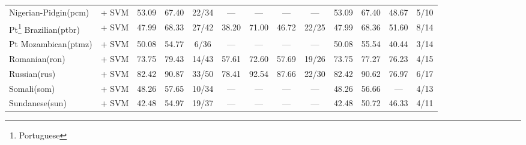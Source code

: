 \begin{table*}[h]
{\begin{tabular}{l|c|ccc|cccc|cccc}
            Nigerian-Pidgin(pcm)                    & \citep{wang2024multilingual}   + SVM                                                         & 53.09                        & 67.40                        & 22/34                       & —             & —             & —                 & —             & 53.09         & 67.40         & 48.67             & 5/10          \\
            Pt\footnote{Portuguese} Brazilian(ptbr) & \citep{souza2020bertimbau} + SVM                                                             & 47.99                        & 68.33                        & 27/42                       & 38.20         & 71.00         & 46.72             & 22/25         & 47.99         & 68.36         & 51.60             & 8/14          \\
            Pt Mozambican(ptmz)                     & \citep{wang2024multilingual}   + SVM                                                         & 50.08                        & 54.77                        & 6/36                        & —             & —             & —                 & —             & 50.08         & 55.54         & 40.44             & 3/14          \\
            Romanian(ron)                           & \citep{wang2024multilingual}     + SVM                                                       & 73.75                        & 79.43                        & 14/43                       & 57.61         & 72.60         & 57.69             & 19/26         & 73.75         & 77.27         & 76.23             & 4/15          \\
            Russian(rus)                            & \citep{snegirev2025russianfocusedembeddersexplorationrumteb}     + SVM                       & 82.42                        & 90.87                        & 33/50                       & 78.41         & 92.54         & 87.66             & 22/30         & 82.42         & 90.62         & 76.97             & 6/17          \\
            Somali(som)                             & \citep{wang2024multilingual}       + SVM                                                     & 48.26                        & 57.65                        & 10/34                       & —             & —             & —                 & —             & 48.26         & 56.66         & —                 & 4/13          \\
            Sundanese(sun)                          & \citep{wang2024multilingual}      + SVM                                                      & 42.48                        & 54.97                        & 19/37                       & —             & —             & —                 & —             & 42.48         & 50.72         & 46.33             & 4/11          \\

\end{tabular}}
\end{table*}
